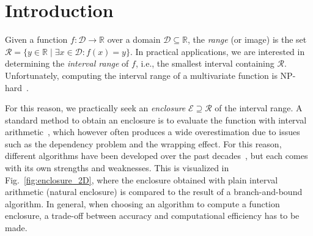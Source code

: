 \documentclass{juliacon}
\begin{document}
\newcommand{\R}{\ensuremath{\mathbb{R}}}
\newcommand{\RE}{RangeEnclosures}
\newcommand{\pkgl}[2]{\href{#1}{\pkg{#2}}}
\newcommand{\pkg}[1]{\texttt{#1.jl}}



\maketitle

\begin{abstract}
Computing the range of a function is needed in several application domains. During the past decades, several algorithms to compute or approximate the range have been developed, each with its own merits and limitations.
Motivated by this, we introduce \pkg{\RE}, a unified framework to bound the range of univariate and multivariate functions. In addition to its own algorithms, the package allows to easily integrate third-party algorithms, offering a unified interface that can be used across different domains and allows to easily benchmark different approaches.
\end{abstract}



\section{Introduction}

Given a function $f: \mathcal{D} \to \R$ over a domain $\mathcal{D}\subseteq\R$, the \emph{range} (or image) is the set $\mathcal{R}=\{y\in\R \mid \exists x\in\mathcal{D}: f(x)=y\}$. In practical applications, we are interested in determining the \textit{interval range} of $f$, i.e., the smallest interval containing $\mathcal{R}$. Unfortunately, computing the interval range of a multivariate function is NP-hard~\cite{kreinovich2002range}.

For this reason, we practically seek an \textit{enclosure} $\mathcal{E}\supseteq\mathcal{R}$ of the interval range. A standard method to obtain an enclosure is to evaluate the function with interval arithmetic~\cite{moore2009introduction}, which however often produces a wide overestimation due to issues such as the dependency problem and the wrapping effect. For this 
reason, different algorithms have been developed over the past decades~\cite{de2004affine,hansen2003global}, but each comes with its own strengths and weaknesses. This is visualized in Fig.~\ref{fig:enclosure_2D}, where the enclosure obtained with plain interval arithmetic (natural enclosure) is compared to the result of a branch-and-bound algorithm. In general, when choosing an algorithm to compute a function enclosure, a trade-off between accuracy and computational efficiency has to be made.
\end{document}
